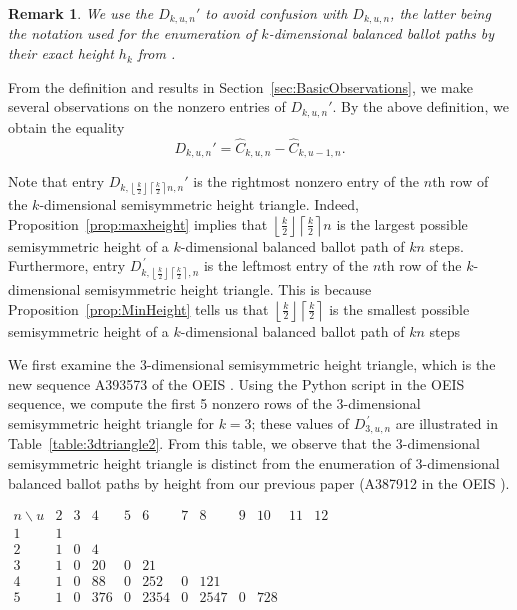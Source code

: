 \documentclass[11pt]{article}
\newtheorem{remark}[theorem]{Remark}
\theoremstyle{remark}
\theoremstyle{definition}
\begin{document}
\begin{remark}
We use the $D_{k, u, n}'$ to avoid confusion with $D_{k, u, n}$, the latter being the notation used for the enumeration of $k$-dimensional balanced ballot paths by their exact height $h_k$ from \cite{MR5034574}.\end{remark}

From the definition and results in Section~\ref{sec:BasicObservations}, we make several observations on the nonzero entries of $D_{k, u, n}'$. By the above definition, we obtain the equality $$D_{k, u, n}' = \widehat{C}_{k, u, n} - \widehat{C}_{k, u-1, n}.$$

Note that entry $D_{k,\left\lfloor  \frac{k}{2} \right\rfloor \left\lceil  \frac{k}{2} \right\rceil n, n}'$ is the rightmost nonzero entry of the $n$th row of the $k$-dimensional semisymmetric height triangle. Indeed, Proposition~\ref{prop:maxheight} implies that $\left\lfloor  \frac{k}{2} \right\rfloor \left\lceil  \frac{k}{2} \right\rceil n$ is the largest possible semisymmetric height of a $k$-dimensional balanced ballot path of $kn$ steps. Furthermore, entry $D_{k,\left\lfloor  \frac{k}{2} \right\rfloor \left\lceil  \frac{k}{2} \right\rceil, n}^{\, \prime}$ is the leftmost entry of the $n$th row of the $k$-dimensional semisymmetric height triangle. This is because Proposition~\ref{prop:MinHeight} tells us that $\left\lfloor  \frac{k}{2} \right\rfloor \left\lceil  \frac{k}{2} \right\rceil$ is the smallest possible semisymmetric height of a $k$-dimensional balanced ballot path of $kn$ steps

We first examine the 3-dimensional semisymmetric height triangle, which is the new sequence A393573 of the OEIS \cite{oeis}. Using the Python script in the OEIS sequence, we compute the first 5 nonzero rows of the 3-dimensional semisymmetric height triangle for $k=3$; these values of $D_{3, u, n}^{\,\prime}$ are illustrated in Table~\ref{table:3dtriangle2}. From this table, we observe that the 3-dimensional semisymmetric height triangle is distinct from the enumeration of $3$-dimensional balanced ballot paths by height from our previous paper \cite{MR5034574} (A387912 in the OEIS \cite{oeis}).

\begin{table}[H]
    \centering
$\begin{array}{c|ccccccccccc} n \backslash u & 2 & 3 & 4 & 5 & 6 & 7 & 8 & 9 & 10 & 11 & 12\\
\hline
1 & 1 \\
2 & 1 & 0 & 4 \\ 3 & 1 & 0 & 20 & 0 & 21
\\ 4 & 1 & 0 & 88 & 0 & 252 & 0 & 121
\\ 5 & 1 & 0 & 376 & 0 & 2354 & 0 & 2547 & 0 & 728
\end{array}$

    \caption{Some entries $D_{3, u, n}'$ of the $3$-dimensional semisymmetric height triangle. The variable $u$ stands for semisymmetric height.}
    \label{table:3dtriangle2}
\end{table}
\end{document}
